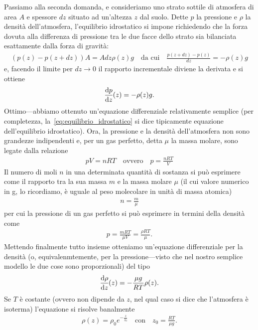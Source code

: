 \begin{solution}
Passiamo alla seconda domanda, e consideriamo uno strato sottile di atmosfera di
area $A$ e spessore $dz$ situato ad un'altezza $z$ dal suolo. Dette $p$ la
pressione e $\rho$ la densità dell'atmosfera, l'equilibrio idrostatico si impone
richiedendo che la forza dovuta alla differenza di pressione tra le due facce dello
strato sia bilanciata esattamente dalla forza di gravità:
\begin{align*}
  \left(p(z) - p(z + dz)\right) A = A dz \rho(z) g \quad \text{da cui} \quad
  \frac{p(z + dz) - p(z)}{dz} = -\rho(z) g
\end{align*}
e, facendo il limite per $dz \rightarrow 0$ il rapporto incrementale diviene la
derivata e si ottiene
\begin{align}\label{eq:equilibrio_idrostatico}
  \td{p}{z}{z} = -\rho(z) g.
\end{align}
Ottimo---abbiamo ottenuto un'equazione differenziale relativamente semplice
(per completezza, la~\eqref{eq:equilibrio_idrostatico} si dice tipicamente
equazione dell'equilibrio idrostatico).
Ora, la pressione e la densità dell'atmosfera non sono grandezze indipendenti e,
per un gas perfetto, detta $\mu$ la massa molare, sono legate dalla relazione
\begin{align*}
  pV = n R T \quad \text{ovvero} \quad p = \frac{n R T}{V}
\end{align*}
Il numero di moli $n$ in una determinata quantità di sostanza si può esprimere
come il rapporto tra la sua massa $m$ e la massa molare $\mu$ (il cui valore numerico
in g, lo ricordiamo, è uguale al peso molecolare in unità di massa atomica)
\begin{align*}
  n = \frac{m}{\mu}
\end{align*}
per cui la pressione di un gas perfetto si può esprimere in termini della
densità come
\begin{align*}
  p = \frac{m R T}{\mu V} = \frac{\rho RT}{\mu}.
\end{align*}
Mettendo finalmente tutto insieme otteniamo un'equazione differenziale per la
densità (o, equivalenmtemente, per la pressione---visto che nel nostro semplice
modello le due cose sono proporzionali) del tipo
\begin{align}
  \td{\rho}{z}{z} = -\frac{\mu g}{R T} \rho(z).
\end{align}
Se $T$ è costante (ovvero non dipende da $z$, nel qual caso si dice che
l'atmosfera è isoterma) l'equazione si risolve banalmente
\begin{align}
  \rho(z) = \rho_0 e^{-\frac{z}{z_0}} \quad \text{con} \quad z_0 = \frac{R T}{\mu g}.

\end{align}
\end{solution}
